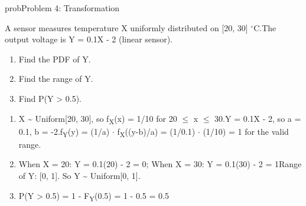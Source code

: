 \begin{PSbox}[unbreakable]{prob}{Problem 4: Transformation}

A sensor measures temperature X uniformly distributed on [20, 30] \ensuremath{^{\circ}}C.\PSbr{}The output voltage is Y = 0.1X - 2 (linear sensor).

\begin{enumerate}
\def\labelenumi{(\alph{enumi})}
\tightlist
\item
  Find the PDF of Y.
\item
  Find the range of Y.
\item
  Find P(Y \textgreater{} 0.5).
\end{enumerate}

\PSsolution{} 

\begin{enumerate}
\def\labelenumi{(\alph{enumi})}
\item
  X \textasciitilde{} Uniform[20, 30], so f\textsubscript{X}(x) = 1/10 for 20 \ensuremath{\le} x \ensuremath{\le} 30.\PSbr{}Y = 0.1X - 2, so a = 0.1, b = -2.\PSbr{}f\textsubscript{Y}(y) = (1/\textbar{}a\textbar{}) \ensuremath{\cdot} f\textsubscript{X}((y-b)/a) = (1/0.1) \ensuremath{\cdot} (1/10) = 1 for the valid range.
\item
  When X = 20: Y = 0.1(20) - 2 = 0; When X = 30: Y = 0.1(30) - 2 = 1\PSbr{}Range of Y: [0, 1]. So Y \textasciitilde{} Uniform[0, 1].
\item
  P(Y \textgreater{} 0.5) = 1 - F\textsubscript{Y}(0.5) = 1 - 0.5 = 0.5
\end{enumerate}

\end{PSbox}

